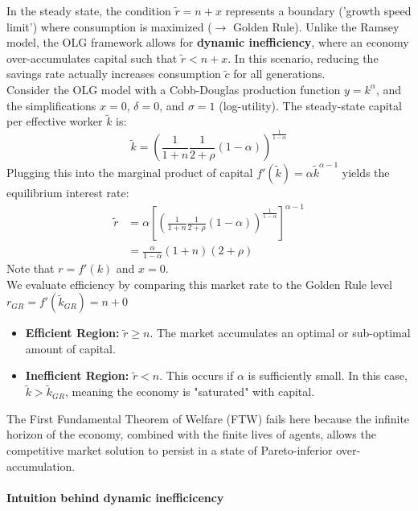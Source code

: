 In the steady state, the condition $\tilde{r} = n + x$ represents a boundary ('growth speed limit') where consumption is maximized ($\rightarrow$ Golden Rule). Unlike the Ramsey model, the OLG framework allows for \textbf{dynamic inefficiency}, where an economy over-accumulates capital such that $\tilde{r} < n + x$. In this scenario, reducing the savings rate actually increases consumption $\tilde{c}$ for all generations.
\\
Consider the  OLG model with a Cobb-Douglas production function $y = k^\alpha$, and the simplifications $x=0$, $\delta = 0$, and $\sigma=1$ (log-utility). The steady-state capital per effective worker $\tilde{k}$ is:
\begin{equation*}
\tilde{k} = \left( \frac{1}{1+n} \frac{1}{2+\rho} (1-\alpha) \right)^{\frac{1}{1-\alpha}}
\end{equation*}
\noinent Plugging this into the marginal product of capital $f'(\tilde{k}) = \alpha \tilde{k}^{\alpha-1}$ yields the equilibrium interest rate:
\begin{align*}
\tilde{r} &= \alpha \left[ \left( \frac{1}{1+n} \frac{1}{2+\rho} (1-\alpha) \right)^{\frac{1}{1-\alpha}} \right]^{\alpha-1} \\
&= \frac{\alpha}{1-\alpha} (1+n)(2+\rho)
\end{align*}
\noindent Note that $r=f'(k)$ and $x=0$. \\
We evaluate efficiency by comparing this market rate to the Golden Rule level $r_{GR}=f'(\tilde{k}_{GR}) = n+0$
\begin{itemize}
    \item \textbf{Efficient Region:} $\tilde{r} \geq n$. The market accumulates an optimal or sub-optimal amount of capital.
    \item \textbf{Inefficient Region:} $\tilde{r} < n$. This occurs if $\alpha$ is sufficiently small. In this case, $\tilde{k} > \tilde{k}_{GR}$, meaning the economy is "saturated" with capital.
\end{itemize}
\noindent The First Fundamental Theorem of Welfare (FTW) fails here because the infinite horizon of the economy, combined with the finite lives of agents, allows the competitive market solution to persist in a state of Pareto-inferior over-accumulation.
\\\\
\textbf{Intuition behind dynamic inefficicency}

